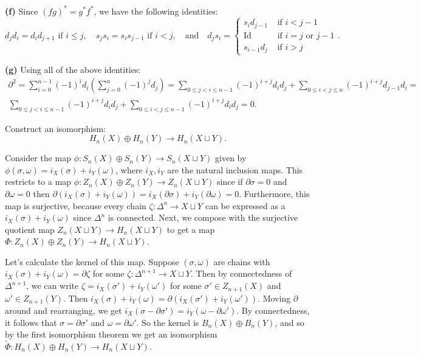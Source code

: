 \documentclass[11pt,letterpaper]{article}
\begin{document}
\begin{solution}
    \textbf{(f)} Since $(fg)^*=g^*f^*$, we have the following identities:
    \[
        d_jd_i=d_{i}d_{j+1} \textrm{ if } i\leq j,\quad s_js_i=s_{i}s_{j-1} \textrm{ if } i< j,\quad\textrm{and}\quad d_js_i=\begin{cases}s_{i}d_{j-1} & \text{ if }i<j-1\\ \text{Id} & \text{ if }i=j \text{ or } j-1 \\ s_{i-1}d_{j} & \text{ if } i > j \end{cases}
    .\] 
    
    \textbf{(g)} Using all of the above identities:
    \[\begin{aligned}
    \partial^2 = \sum^{n-1}_{i=0}(-1)^id_i\left(\sum^n_{j=0}(-1)^jd_j\right)=\sum_{0\leq j < i \leq n-1}(-1)^{i+j}d_id_j+\sum_{0\leq i < j \leq n}(-1)^{i+j}d_{j-1}d_i=\\\sum_{0\leq j < i \leq n-1}(-1)^{i+j}d_id_j+\sum_{0\leq i < j \leq n-1}(-1)^{i+j}d_id_j=0.
    \end{aligned}\]
\end{solution}

\begin{problem}
    Construct an isomorphism:
    \[
        H_n(X)\oplus H_n(Y) \to H_n(X\sqcup Y)
    .\] 
\end{problem}

\begin{solution}
    Consider the map $\phi : S_n(X)\oplus S_n(Y) \to S_n(X\sqcup Y)$ given by $\phi(\sigma, \omega) = i_X(\sigma)+i_Y(\omega)$, where $i_X, i_Y$ are the natural inclusion maps. This restricts to a map $\phi : Z_n(X)\oplus Z_n(Y)\to Z_n(X\sqcup Y)$ since if $\partial \sigma = 0$ and $\partial \omega = 0$ then $\partial(i_X(\sigma)+i_Y(\omega))=i_X(\partial\sigma)+i_Y(\partial\omega)=0$. Furthermore, this map is surjective, because every chain $\zeta : \Delta^n \to X\sqcup Y$ can be expressed as a $i_X(\sigma)+i_Y(\omega)$ since $\Delta^n$ is connected. Next, we compose with the surjective quotient map $Z_n(X\sqcup Y) \to H_n(X\sqcup Y)$ to get a map $\Phi : Z_n(X)\oplus Z_n(Y) \to H_n(X\sqcup Y)$.
    
    Let's calculate the kernel of this map. Suppose $(\sigma, \omega)$ are chains with $i_X(\sigma)+i_Y(\omega)=\partial \zeta$ for some $\zeta : \Delta^{n+1} \to X\sqcup Y$. Then by connectedness of $\Delta^{n+1}$, we can write $\zeta=i_X(\sigma')+i_Y(\omega')$ for some $\sigma'\in Z_{n+1}(X)$ and $\omega'\in Z_{n+1}(Y)$. Then $i_X(\sigma)+i_Y(\omega)=\partial(i_X(\sigma')+i_Y(\omega'))$. 
    Moving $\partial$ around and rearranging, we get $i_X(\sigma - \partial \sigma')=i_Y(\omega - \partial \omega')$. By connectedness, it follows that $\sigma = \partial \sigma'$ and $\omega = \partial \omega'$. So the kernel is $B_n(X)\oplus B_n(Y)$, and so by the first isomorphism theorem we get an isomorphism $\tilde{\Phi} : H_n(X)\oplus H_n(Y) \to H_n(X\sqcup Y)$.
\end{solution}
\end{document}
